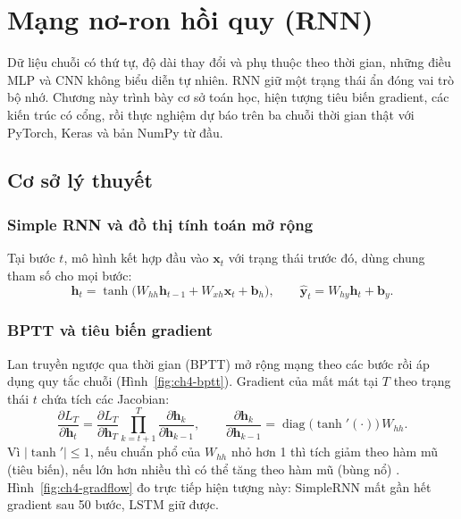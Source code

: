 \chapter{Mạng nơ-ron hồi quy (RNN)}\label{chap:rnn}

Dữ liệu chuỗi có thứ tự, độ dài thay đổi và phụ thuộc theo thời gian, những điều MLP và CNN không biểu diễn tự nhiên. RNN \cite{ch4:elman1990,ch1:rumelhart1986} giữ một trạng thái ẩn đóng vai trò bộ nhớ. Chương này trình bày cơ sở toán học, hiện tượng
tiêu biến gradient, các kiến trúc có cổng, rồi thực nghiệm dự báo trên ba chuỗi thời gian thật với PyTorch, Keras và bản NumPy từ đầu.

\section{Cơ sở lý thuyết}\label{sec:rnn-theory}
\subsection{Simple RNN và đồ thị tính toán mở rộng}
Tại bước $t$, mô hình kết hợp đầu vào $\mathbf{x}_t$ với trạng thái trước đó, dùng chung tham số cho mọi bước:
\begin{equation}
  \mathbf{h}_t=\tanh\big(W_{hh}\mathbf{h}_{t-1}+W_{xh}\mathbf{x}_t+\mathbf{b}_h\big),\qquad \hat{\mathbf{y}}_t=W_{hy}\mathbf{h}_t+\mathbf{b}_y.
\end{equation}


\subsection{BPTT và tiêu biến gradient}
Lan truyền ngược qua thời gian (BPTT) \cite{ch4:werbos1990} mở rộng mạng theo các bước rồi áp dụng quy tắc chuỗi (Hình~\ref{fig:ch4-bptt}). Gradient của mất mát tại $T$ theo trạng thái $t$ chứa tích các Jacobian:
\begin{equation}
  \frac{\partial L_T}{\partial\mathbf{h}_t}=\frac{\partial L_T}{\partial\mathbf{h}_T}\prod_{k=t+1}^{T}\frac{\partial\mathbf{h}_k}{\partial\mathbf{h}_{k-1}},\qquad
  \frac{\partial\mathbf{h}_k}{\partial\mathbf{h}_{k-1}}=\operatorname{diag}\big(\tanh'(\cdot)\big)\,W_{hh}.
\end{equation}
Vì $|\tanh'|\le1$, nếu chuẩn phổ của $W_{hh}$ nhỏ hơn 1 thì tích giảm theo hàm mũ (tiêu biến), nếu lớn hơn nhiều thì có thể tăng theo hàm mũ (bùng nổ) \cite{ch4:bengio1994,ch4:pascanu2013}. Hình~\ref{fig:ch4-gradflow} đo trực tiếp hiện tượng này:
SimpleRNN mất gần hết gradient sau 50 bước, LSTM giữ được.

